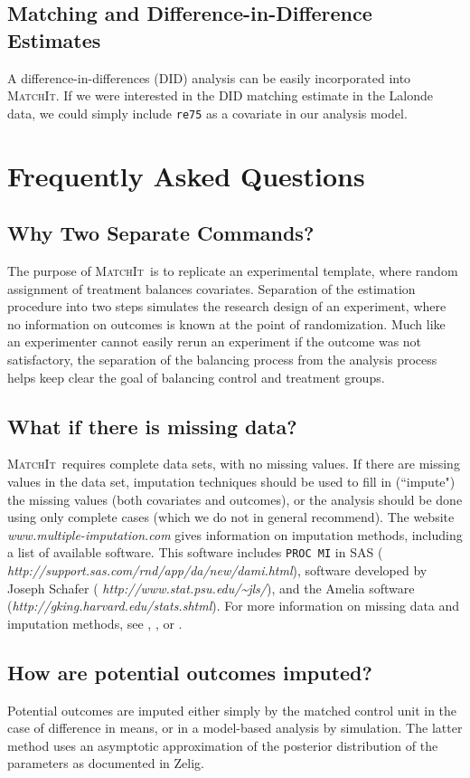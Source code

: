 \documentclass[oneside,letterpaper,titlepage]{article}
\newcommand{\MatchIt}{\textsc{MatchIt}}
\begin{document}
\subsection{Matching and Difference-in-Difference Estimates}
A difference-in-differences (DID) analysis can be easily incorporated into
\MatchIt.  If we were interested in the DID matching estimate in the
Lalonde data, we could simply include \texttt{re75} as a covariate in
our analysis model. 


\section{Frequently Asked Questions}

\subsection{Why Two Separate Commands?}
The purpose of \MatchIt\ is to replicate an experimental template,
where random assignment of treatment balances covariates.  Separation
of the estimation procedure into two steps simulates the research design of an experiment,
where no information on outcomes is known at the point of
randomization.  Much like an experimenter cannot easily rerun an
experiment if the outcome was not satisfactory, the separation of the
balancing process from the analysis process helps keep clear the goal
of balancing control and treatment groups. 

\subsection{What if there is missing data?}
\MatchIt\ requires complete data sets, with no missing values.  If
there are missing values in the data set, imputation techniques should
be used to fill in (``impute") the missing values (both covariates and
outcomes), or the analysis should be done using only complete cases
(which we do not in general recommend).  The website {\em
  www.multiple-imputation.com} gives information on imputation
methods, including a list of available software.  This software
includes \texttt{PROC MI} in SAS ({\em
  http://support.sas.com/rnd/app/da/new/dami.html}),
software developed by Joseph Schafer ({\em
  http://www.stat.psu.edu/\~{}jls/}), and the Amelia software 
({\em http://gking.harvard.edu/stats.shtml}).  For more information on
missing data and imputation methods, see 
\cite{KinHonJos01}, \cite{LitRub02}, or \cite{Schafer97}.  

\subsection{How are potential outcomes imputed?}  Potential outcomes
are imputed either simply by the matched control unit in the case of
difference in means, or in a model-based analysis by simulation.  The
latter method uses an asymptotic approximation of the posterior
distribution of the parameters as documented in Zelig.  
\end{document}
